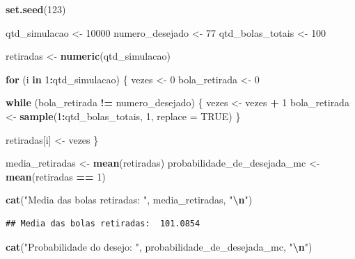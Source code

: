 \documentclass[
]{article}
\newenvironment{Shaded}{\begin{snugshade}}{\end{snugshade}}
\newcommand{\AttributeTok}[1]{\textcolor[rgb]{0.13,0.29,0.53}{#1}}
\newcommand{\ConstantTok}[1]{\textcolor[rgb]{0.56,0.35,0.01}{#1}}
\newcommand{\ControlFlowTok}[1]{\textcolor[rgb]{0.13,0.29,0.53}{\textbf{#1}}}
\newcommand{\DecValTok}[1]{\textcolor[rgb]{0.00,0.00,0.81}{#1}}
\newcommand{\FunctionTok}[1]{\textcolor[rgb]{0.13,0.29,0.53}{\textbf{#1}}}
\newcommand{\NormalTok}[1]{#1}
\newcommand{\OtherTok}[1]{\textcolor[rgb]{0.56,0.35,0.01}{#1}}
\newcommand{\SpecialCharTok}[1]{\textcolor[rgb]{0.81,0.36,0.00}{\textbf{#1}}}
\newcommand{\StringTok}[1]{\textcolor[rgb]{0.31,0.60,0.02}{#1}}
\begin{document}
\begin{Shaded}
\begin{Highlighting}[]
\FunctionTok{set.seed}\NormalTok{(}\DecValTok{123}\NormalTok{)}

\NormalTok{qtd\_simulacao }\OtherTok{\textless{}{-}} \DecValTok{10000}
\NormalTok{numero\_desejado }\OtherTok{\textless{}{-}} \DecValTok{77}
\NormalTok{qtd\_bolas\_totais }\OtherTok{\textless{}{-}} \DecValTok{100}

\NormalTok{retiradas }\OtherTok{\textless{}{-}} \FunctionTok{numeric}\NormalTok{(qtd\_simulacao)}

\ControlFlowTok{for}\NormalTok{ (i }\ControlFlowTok{in} \DecValTok{1}\SpecialCharTok{:}\NormalTok{qtd\_simulacao) \{}
\NormalTok{  vezes }\OtherTok{\textless{}{-}} \DecValTok{0}
\NormalTok{  bola\_retirada }\OtherTok{\textless{}{-}} \DecValTok{0}
  
  \ControlFlowTok{while}\NormalTok{ (bola\_retirada }\SpecialCharTok{!=}\NormalTok{ numero\_desejado) \{}
\NormalTok{    vezes }\OtherTok{\textless{}{-}}\NormalTok{ vezes }\SpecialCharTok{+} \DecValTok{1}
\NormalTok{    bola\_retirada }\OtherTok{\textless{}{-}} \FunctionTok{sample}\NormalTok{(}\DecValTok{1}\SpecialCharTok{:}\NormalTok{qtd\_bolas\_totais, }\DecValTok{1}\NormalTok{, }\AttributeTok{replace =} \ConstantTok{TRUE}\NormalTok{)}
\NormalTok{  \}}
  
\NormalTok{  retiradas[i] }\OtherTok{\textless{}{-}}\NormalTok{ vezes}
\NormalTok{\}}

\NormalTok{media\_retiradas }\OtherTok{\textless{}{-}} \FunctionTok{mean}\NormalTok{(retiradas)}
\NormalTok{probabilidade\_de\_desejada\_mc }\OtherTok{\textless{}{-}} \FunctionTok{mean}\NormalTok{(retiradas }\SpecialCharTok{==} \DecValTok{1}\NormalTok{)}

\FunctionTok{cat}\NormalTok{(}\StringTok{"Media das bolas retiradas: "}\NormalTok{, media\_retiradas, }\StringTok{"}\SpecialCharTok{\textbackslash{}n}\StringTok{"}\NormalTok{)}
\end{Highlighting}
\end{Shaded}

\begin{verbatim}
## Media das bolas retiradas:  101.0854
\end{verbatim}

\begin{Shaded}
\begin{Highlighting}[]
\FunctionTok{cat}\NormalTok{(}\StringTok{"Probabilidade do desejo: "}\NormalTok{, probabilidade\_de\_desejada\_mc, }\StringTok{"}\SpecialCharTok{\textbackslash{}n}\StringTok{"}\NormalTok{)}
\end{Highlighting}
\end{Shaded}
\end{document}
